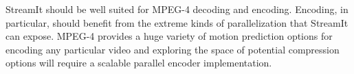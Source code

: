StreamIt should be well suited for MPEG-4 decoding and 
encoding. Encoding, in particular, should benefit
from the extreme kinds of parallelization that StreamIt
can expose. MPEG-4 provides a huge variety of motion
prediction options for encoding any particular video 
and exploring the space of potential compression options
will require a scalable parallel encoder implementation. 